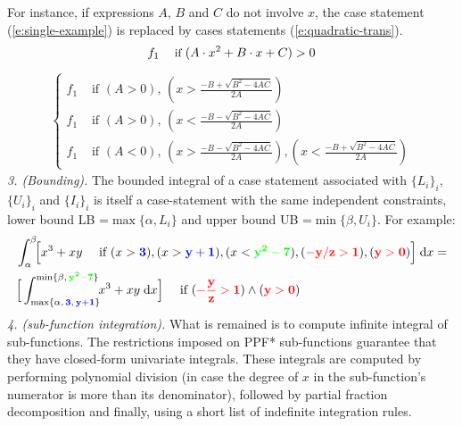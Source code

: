 \documentclass{article} %
\newcommand{\indicator}{\mathbb{I}}%
\newcommand{\case}[2]{#2 &\text{ if } #1}%
\newcommand{\singlecase}[2]{#2 \quad \text{ if } #1}
\newcommand{\dd}{\;\mathrm{d}} %
\begin{document}
\begin{enumerate}[leftmargin=2.6ex]
For instance, if expressions {\footnotesize$A$}, {\footnotesize$B$} and {\footnotesize$C$} do not involve $x$,
the case statement (\ref{e:single-example})
is replaced by cases statements (\ref{e:quadratic-trans}).
\begin{equation}\footnotesize
\label{e:single-example}
\singlecase{(A \cdot x^2 + B \cdot x + C)>0}{f_1}
\end{equation}
{\footnotesize
\begin{align}
\label{e:quadratic-trans}
\begin{cases}
  \case{(A>0), \, (x> \frac{-B + \sqrt{B^2 - 4 A C}}{2 A}) }{f_1} \\ 
  \case{(A>0), \, (x< \frac{-B - \sqrt{B^2 - 4 A C}}{2 A}) }{f_1} \\ 
  \case{(A<0), \, (x> \frac{-B - \sqrt{B^2 - 4 A C}}{2 A}),
                              (x< \frac{-B + \sqrt{B^2 - 4 A C}}{2 A})}{f_1}
 \end{cases}
\end{align}
}
\emph{3. (Bounding).} The bounded integral of a case statement 
associated with $\{L_i\}_i$, $\{U_i\}_i$ and $\{I_i\}_i$ 
is itself a case-statement with the same independent constraints,
 lower bound LB =$\max\{\alpha, L_i\}$ and 
 upper bound UB =$ \min\{\beta, U_i\}$.
For example:
{\footnotesize 
\begin{align*}
&\int_{\alpha}^{\beta}\!\! \Big[
\singlecase{(x>{\bf\color{blue}3}), (x>{\bf\color{blue}y+1}), (x<{\bf\color{green}y^2-7}),  
 ({\bf\color{red}-y/z > 1}) , ({\bf\color{red}y>0})}
{x^3 + xy} \Big] \dd x = \\
&\singlecase{({\bf\color{red}-\frac{y}{z} > 1}) \wedge ({\bf\color{red}y>0})}
{\Big[ \int_{\max\{\alpha, \,{\bf {\color{blue}3}, \, {\color{blue}y+1}}\}}^{\min\{\beta, \, {\bf\color{green} y^2 - 7}\}} \!\! x^3 + xy \dd x \Big]} 
\end{align*}  
}
\emph{4. (sub-function integration).} %
What is remained is to compute infinite integral of sub-functions. 
The restrictions imposed on PPF* sub-functions 
guarantee that they have closed-form %
univariate integrals.
These integrals are computed by performing polynomial division 
(in case the degree of $x$ in the sub-function's numerator is more than its denominator),
followed by partial fraction decomposition and finally, using a short list of indefinite integration rules.



\end{enumerate}
\end{document}
